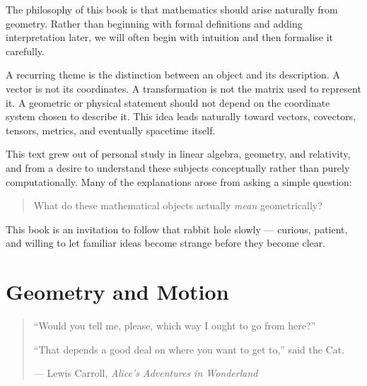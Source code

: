 \documentclass[11pt,openany]{book}
\theoremstyle{definition}
\begin{document}
\medskip

The philosophy of this book is that mathematics should arise naturally from geometry. 
Rather than beginning with formal definitions and adding interpretation later, we will 
often begin with intuition and then formalise it carefully.

\medskip

A recurring theme is the distinction between an object and its description. A vector is 
not its coordinates. A transformation is not the matrix used to represent it. A geometric 
or physical statement should not depend on the coordinate system chosen to describe it. 
This idea leads naturally toward vectors, covectors, tensors, metrics, and eventually 
spacetime itself.

\medskip

This text grew out of personal study in linear algebra, geometry, and relativity, and 
from a desire to understand these subjects conceptually rather than purely computationally. 
Many of the explanations arose from asking a simple question:

\begin{quote}
What do these mathematical objects actually \textit{mean} geometrically?
\end{quote}

\medskip



\medskip

This book is an invitation to follow that rabbit hole slowly --- curious, patient, and 
willing to let familiar ideas become strange before they become clear.

\tableofcontents

\mainmatter

\part{Geometry and Motion}



\vspace*{0.35\textheight}

\begin{quote}
\centering
``Would you tell me, please, which way I ought to go from here?''

\medskip

``That depends a good deal on where you want to get to,'' said the Cat.

\medskip

--- Lewis Carroll, \textit{Alice's Adventures in Wonderland}
\end{quote}
\end{document}
